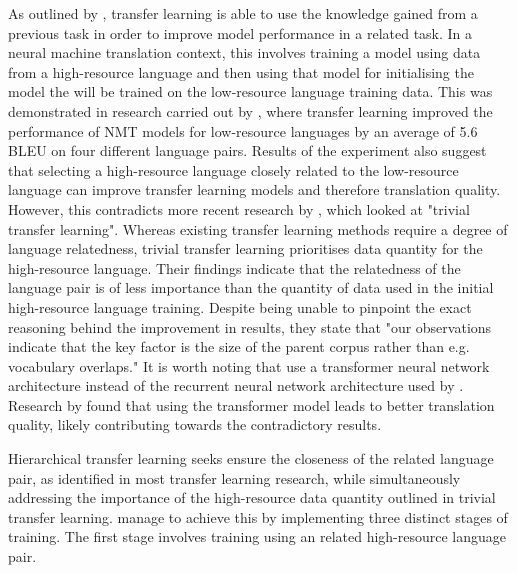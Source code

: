 As outlined by \cite{torrey_transfer_2009}, transfer learning is able to use the knowledge gained from a previous task in order to improve model performance in a related task.
In a neural machine translation context, this involves training a model using data from a high-resource language and then using that model for initialising the model the will be trained on the low-resource language training data. This was demonstrated in research carried out by \cite{zoph_transfer_2016}, where transfer learning improved the performance of NMT models for low-resource languages by an average of 5.6 \acrshort{BLEU} on four different language pairs. Results of the experiment also suggest that selecting a high-resource language closely related to the low-resource language can improve transfer learning models and therefore translation quality. However, this contradicts more recent research by \cite{kocmi_trivial_2018}, which looked at "trivial transfer learning". Whereas existing transfer learning methods require a degree of language relatedness, trivial transfer learning prioritises data quantity for the high-resource language. Their findings indicate that the relatedness of the language pair is of less importance than the quantity of data used in the initial high-resource language training. Despite being unable to pinpoint the exact reasoning behind the improvement in results, they state that "our observations indicate that the key factor is the size of the parent corpus rather than e.g. vocabulary overlaps."
It is worth noting that \cite{kocmi_trivial_2018} use a transformer neural network architecture instead of the recurrent neural network architecture used by \cite{zoph_transfer_2016}. Research by \cite{popel_training_2018} found that using the transformer model leads to better translation quality, likely contributing towards the contradictory results.


Hierarchical transfer learning seeks ensure the closeness of the related language pair, as identified in most transfer learning research, while simultaneously addressing the importance of the high-resource data quantity outlined in trivial transfer learning. \cite{luo_hierarchical_2019} manage to achieve this by implementing three distinct stages of training. The first stage involves training using an related high-resource language pair.




